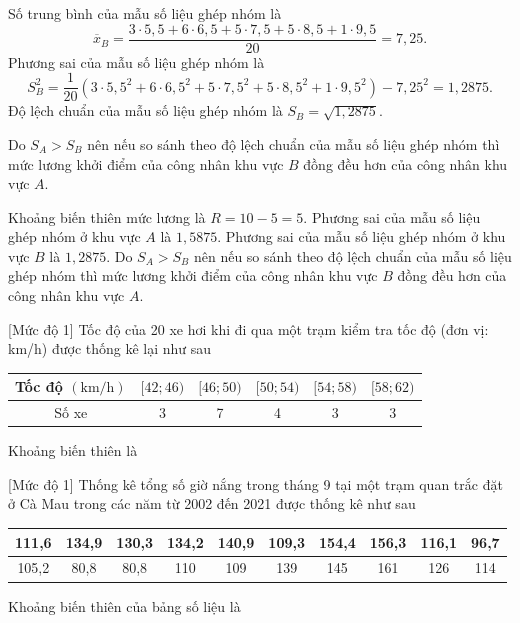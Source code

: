 \begin{ex}
{\begin{itemize}
\begin{itemize}
			Số trung bình của mẫu số liệu ghép nhóm là
			$$ \overline{x}_B=\dfrac{3\cdot 5{,}5+6\cdot 6{,}5+5\cdot 7{,}5+5\cdot 8{,}5+1\cdot 9{,}5}{20}=7{,}25. $$
			Phương sai của mẫu số liệu ghép nhóm là
			$$ S_B^2=\dfrac{1}{20}\left( 3\cdot 5{,}5^2+6\cdot 6{,}5^2+5\cdot 7{,}5^2+5\cdot 8{,}5^2+1\cdot 9{,}5^2\right)-7{,}25^2=1{,}2875.  $$
			Độ lệch chuẩn của mẫu số liệu ghép nhóm là $ S_B=\sqrt{1{,}2875} $.
		\end{itemize}
		Do $S_A > S_B$ nên nếu so sánh theo độ lệch chuẩn của mẫu số liệu ghép nhóm thì mức lương khởi điểm của công nhân khu vực $B$ đồng đều hơn của công nhân khu vực $A$.
	\end{itemize}
	\begin{itemchoice}
		\itemch Khoảng biến thiên mức lương là $ R=10-5=5 $.
		\itemch Phương sai của mẫu số liệu ghép nhóm ở khu vực $ A $ là $ 1{,}5875 $.
		\itemch Phương sai của mẫu số liệu ghép nhóm ở khu vực $ B $ là $ 1{,}2875 $.
		\itemch Do $S_A > S_B$ nên nếu so sánh theo độ lệch chuẩn của mẫu số liệu ghép nhóm thì mức lương khởi điểm của công nhân khu vực $B$ đồng đều hơn của công nhân khu vực $A$.
	\end{itemchoice}	
}
\end{ex}

\begin{bt}%
[Mức độ 1]
	Tốc độ của 20 xe hơi khi đi qua một trạm kiểm tra tốc độ (đơn vị: km/h) được thống kê lại như sau
	\begin{center}
		\begin{tabular}{|c|c|c|c|c|c|}
			\hline Tốc độ $(\mathrm{km} / \mathrm{h})$ & {$[42 ; 46)$} & {$[46 ; 50)$} & {$[50 ; 54)$} & {$[54 ; 58)$} & {$[58 ; 62)$} \\
			\hline Số xe & 3 & 7 & 4 & 3 & 3 \\
			\hline
		\end{tabular}
	\end{center}
	Khoảng biến thiên là
\end{bt}

\begin{bt}%
[Mức độ 1]
	Thống kê tổng số giờ nắng trong tháng 9 tại một trạm quan trắc đặt ở Cà Mau trong các năm từ 2002 đến 2021 được thống kê như sau
	\begin{center}
		\begin{tabular}{|c|c|c|c|c|c|c|c|c|c|}
			\hline 111,6 & 134,9 & 130,3 & 134,2 & 140,9 & 109,3 & 154,4 & 156,3 & 116,1 & 96,7 \\
			\hline 105,2 & 80,8 & 80,8 & 110 & 109 & 139 & 145 & 161 & 126 & 114 \\
			\hline
		\end{tabular}
	\end{center}
	Khoảng biến thiên của bảng số liệu là
\end{bt}

